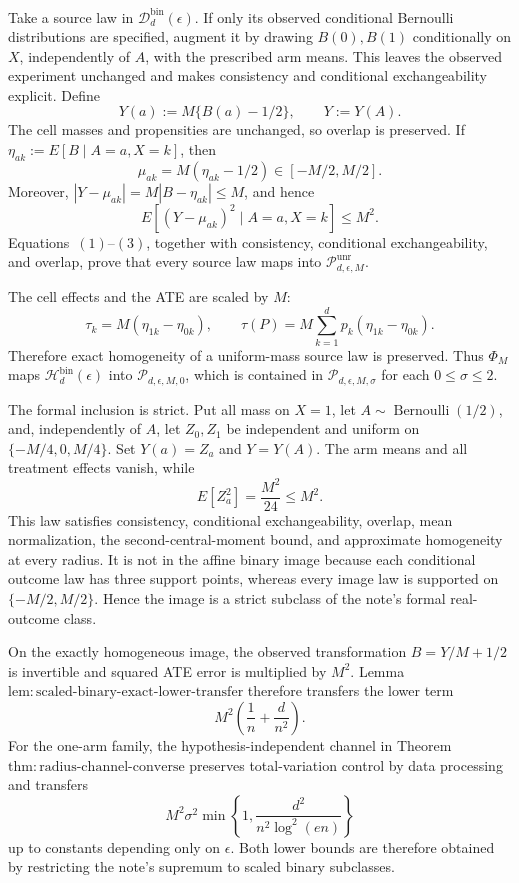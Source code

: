 Take a source law in \(\mathcal D_d^{\mathrm{bin}}(\epsilon)\).  If only its observed conditional Bernoulli distributions are specified, augment it by drawing \(B(0),B(1)\) conditionally on \(X\), independently of \(A\), with the prescribed arm means.  This leaves the observed experiment unchanged and makes consistency and conditional exchangeability explicit.  Define
\[
 Y(a):=M\{B(a)-1/2\},\qquad Y:=Y(A).
\tag{1}
\]
The cell masses and propensities are unchanged, so overlap is preserved.  If
\(
 \eta_{ak}:=E[B\mid A=a,X=k]
\), then
\[
 \mu_{ak}=M(\eta_{ak}-1/2)\in[-M/2,M/2].
\tag{2}
\]
Moreover, \(|Y-\mu_{ak}|=M|B-\eta_{ak}|\le M\), and hence
\[
 E[(Y-\mu_{ak})^2\mid A=a,X=k]\le M^2.
\tag{3}
\]
Equations~\((1)\)--\((3)\), together with consistency, conditional exchangeability, and overlap, prove that every source law maps into \(\mathcal P_{d,\epsilon,M}^{\mathrm{unr}}\).

The cell effects and the ATE are scaled by \(M\):
\[
 \tau_k=M(\eta_{1k}-\eta_{0k}),
 \qquad
 \tau(P)=M\sum_{k=1}^dp_k(\eta_{1k}-\eta_{0k}).
\tag{4}
\]
Therefore exact homogeneity of a uniform-mass source law is preserved.  Thus \(\Phi_M\) maps \(\mathcal H_d^{\mathrm{bin}}(\epsilon)\) into \(\mathcal P_{d,\epsilon,M,0}\), which is contained in \(\mathcal P_{d,\epsilon,M,\sigma}\) for each \(0\le\sigma\le2\).

The formal inclusion is strict.  Put all mass on \(X=1\), let \(A\sim\operatorname{Bernoulli}(1/2)\), and, independently of \(A\), let \(Z_0,Z_1\) be independent and uniform on \(\{-M/4,0,M/4\}\).  Set \(Y(a)=Z_a\) and \(Y=Y(A)\).  The arm means and all treatment effects vanish, while
\[
 E[Z_a^2]=\frac{M^2}{24}\le M^2.
\tag{5}
\]
This law satisfies consistency, conditional exchangeability, overlap, mean normalization, the second-central-moment bound, and approximate homogeneity at every radius.  It is not in the affine binary image because each conditional outcome law has three support points, whereas every image law is supported on \(\{-M/2,M/2\}\).  Hence the image is a strict subclass of the note's formal real-outcome class.

On the exactly homogeneous image, the observed transformation \(B=Y/M+1/2\) is invertible and squared ATE error is multiplied by \(M^2\).  Lemma~\(\mathrm{lem:scaled\text{-}binary\text{-}exact\text{-}lower\text{-}transfer}\) therefore transfers the lower term
\[
 M^2\left(\frac1n+\frac d{n^2}\right).
\tag{6}
\]
For the one-arm family, the hypothesis-independent channel in Theorem~\(\mathrm{thm:radius\text{-}channel\text{-}converse}\) preserves total-variation control by data processing and transfers
\[
 M^2\sigma^2\min\left\{1,
 \frac{d^2}{n^2\log^2(en)}\right\}
\tag{7}
\]
up to constants depending only on \(\epsilon\).  Both lower bounds are therefore obtained by restricting the note's supremum to scaled binary subclasses.

